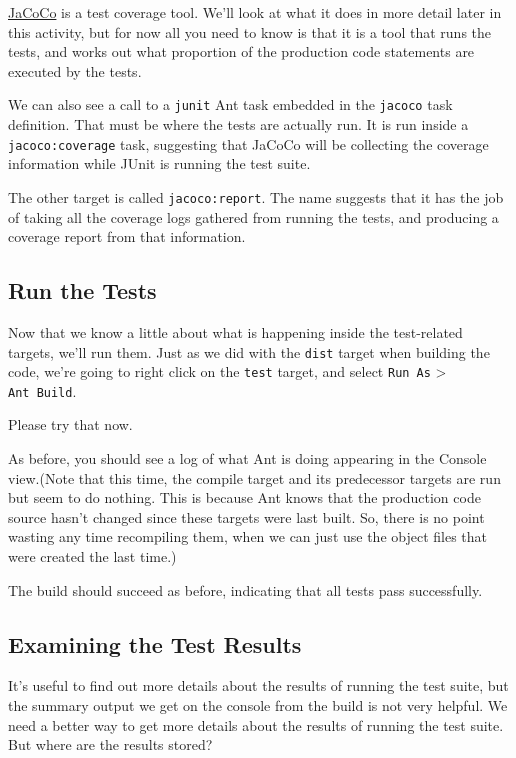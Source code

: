 \documentclass[
]{book}
\begin{document}
\href{https://www.eclemma.org/jacoco/}{JaCoCo} is a test coverage tool. We'll look at what it does in more detail later in this activity, but for now all you need to know is that it is a tool that runs the tests, and works out what proportion of the production code statements are executed by the tests.

We can also see a call to a \texttt{junit} Ant task embedded in the \texttt{jacoco} task definition. That must be where the tests are actually run. It is run inside a \texttt{jacoco:coverage} task, suggesting that JaCoCo will be collecting the coverage information while JUnit is running the test suite.

The other target is called \texttt{jacoco:report}. The name suggests that it has the job of taking all the coverage logs gathered from running the tests, and producing a coverage report from that information.

\hypertarget{run-the-tests}{%
\subsection{Run the Tests}\label{run-the-tests}}

Now that we know a little about what is happening inside the test-related targets, we'll run them. Just as we did with the \texttt{dist} target when building the code, we're going to right click on the \texttt{test} target, and select \texttt{Run\ As} \textgreater{} \texttt{Ant\ Build}.

Please try that now.

As before, you should see a log of what Ant is doing appearing in the Console view.(Note that this time, the compile target and its predecessor targets are run but seem to do nothing. This is because Ant knows that the production code source hasn't changed since these targets were last built. So, there is no point wasting any time recompiling them, when we can just use the object files that were created the last time.)

The build should succeed as before, indicating that all tests pass successfully.

\hypertarget{examining-the-test-results}{%
\subsection{Examining the Test Results}\label{examining-the-test-results}}

It's useful to find out more details about the results of running the test suite, but the summary output we get on the console from the build is not very helpful. We need a better way to get more details about the results of running the test suite. But where are the results stored?
\end{document}
